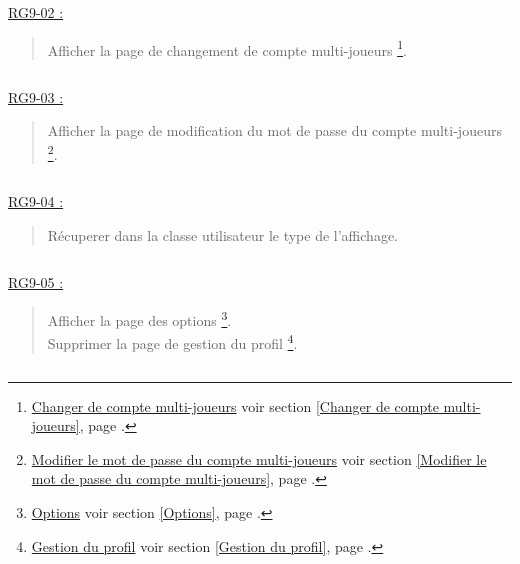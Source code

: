 \documentclass{report}
\begin{document}
			$\,$

			\underline{RG9-02 :}
				\begin{quote}
					Afficher la page de changement de compte multi-joueurs%
						\footnote[1]{
							\hyperlink{Changer de compte multi-joueurs}{Changer de compte multi-joueurs}
							\og voir section \ref{Changer de compte multi-joueurs}, page \pageref{Changer de compte multi-joueurs}.\fg
						}.
				\end{quote}

			$\,$

			\underline{RG9-03 :}
				\begin{quote}
						Afficher la page de modification du mot de passe du compte multi-joueurs%
						\footnote[2]{
							\hyperlink{Modifier le mot de passe du compte multi-joueurs}{Modifier le mot de passe du compte multi-joueurs}
							\og voir section \ref{Modifier le mot de passe du compte multi-joueurs}, page \pageref{Modifier le mot de passe du compte multi-joueurs}.\fg
						}.
				\end{quote}

			$\,$

			\underline{RG9-04 :}
				\begin{quote}
					Récuperer dans la classe utilisateur le type de l'affichage.
				\end{quote}

			$\,$
				
			\underline{RG9-05 :}
				\begin{quote}
					Afficher la page des options%
						\footnote[4]{
							\hyperlink{Options}{Options}
							\og voir section \ref{Options}, page \pageref{Options}.\fg
						}.\\
					Supprimer la page de gestion du profil%
						\footnote[2]{
							\hyperlink{Gestion du profil}{Gestion du profil}
							\og voir section \ref{Gestion du profil}, page \pageref{Gestion du profil}.\fg
						}.
				\end{quote}

			$\,$
							
\end{document}
